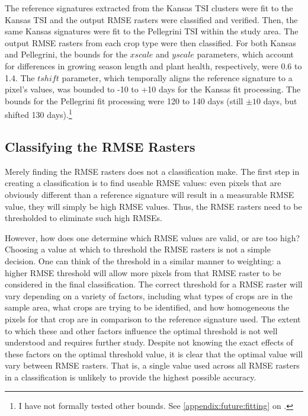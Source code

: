 The reference signatures extracted from the Kansas TSI clusters were fit to the Kansas TSI and the output RMSE rasters were classified and verified. Then, the same Kansas signatures were fit to the Pellegrini TSI within the study area. The output RMSE rasters from each crop type were then classified. For both Kansas and Pellegrini, the bounds for the $xscale$ and $yscale$ parameters, which account for differences in growing season length and plant health, respectively, were 0.6 to 1.4. The $tshift$ parameter, which temporally aligns the reference signature to a pixel's values, was bounded to -10 to +10 days for the Kansas fit processing. The bounds for the Pellegrini fit processing were 120 to 140 days (still $\pm10$ days, but shifted 130 days).\footnote{I have not formally tested other bounds. See \autoref{appendix:future:fitting} on .} 


\subsection{Classifying the RMSE Rasters}
\label{methods:classification}

Merely finding the RMSE rasters does not a classification make. The first step in creating a classification is to find useable RMSE values: even pixels that are obviously different than a reference signature will result in a measurable RMSE value, they will simply be high RMSE values. Thus, the RMSE rasters need to be thresholded to eliminate such high RMSEs.

However, how does one determine which RMSE values are valid, or are too high? Choosing a value at which to threshold the RMSE rasters is not a simple decision. One can think of the threshold in a similar manner to weighting: a higher RMSE threshold will allow more pixels from that RMSE raster to be considered in the final classification. The correct threshold for a RMSE raster will vary depending on a variety of factors, including what types of crops are in the sample area, what crops are trying to be identified, and how homogeneous the pixels for that crop are in comparison to the reference signature used. The extent to which these and other factors influence the optimal threshold is not well understood and requires further study. Despite not knowing the exact effects of these factors on the optimal threshold value, it is clear that the optimal value will vary between RMSE rasters. That is, a single value used across all RMSE rasters in a classification is unlikely to provide the highest possible accuracy.

